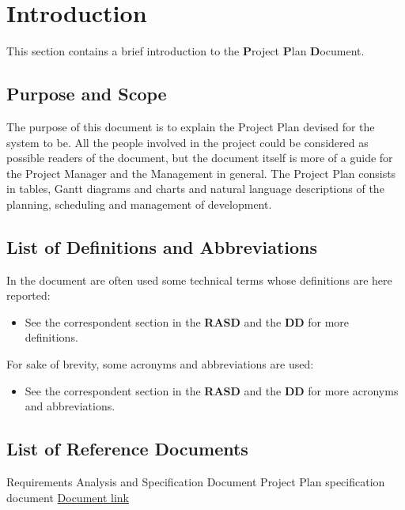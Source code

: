 \section{Introduction}
This section contains a brief introduction to the \textbf{P}roject \textbf{P}lan \textbf{D}ocument.
%
\subsection{Purpose and Scope}
The purpose of this document is to explain the Project Plan devised for the system to be.
All the people involved in the project could be considered as possible readers of the document, but the document itself is more of a guide for the Project Manager and the Management in general.
The Project Plan consists in tables, Gantt diagrams and charts and natural language descriptions of the planning, scheduling and management of \myTaxiService{} development.
%
\subsection{List of Definitions and Abbreviations}
In the document are often used some technical terms whose definitions are here reported:
\begin{itemize}
	\item See the correspondent section in the \textbf{RASD} and the \textbf{DD} for more definitions.
\end{itemize}
For sake of brevity, some acronyms and abbreviations are used:
\begin{itemize}
	 Project Plan Document.
	 Function Points.
	 Internal Logic File.
	 External Logic File.
	 External Input.
	 External Output.
	 External Inquiry.
	 Constructive Cost Model.
	\item See the correspondent section in the \textbf{RASD} and the \textbf{DD} for more acronyms and abbreviations.
\end{itemize}
%
\subsection{List of Reference Documents}
\begin{itemize}
	 Requirements Analysis and Specification Document
	 Project Plan specification document
	 \href{http://csse.usc.edu/csse/research/COCOMOII/cocomo2000.0/CII_modelman2000.0.pdf}{Document link}
\end{itemize}
%